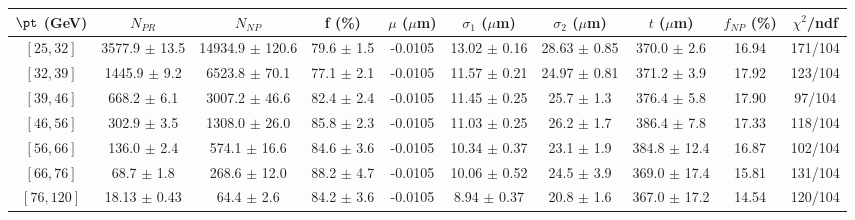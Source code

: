 \begin{tabular}{c||c|c|c|c|c|c|c||c|c}
$\pt$ (GeV) & $N_{PR}$ & $N_{NP}$ & f (\%) & $\mu$ ($\mu$m) & $\sigma_1$ ($\mu$m) & $\sigma_2$ ($\mu$m)  & $t$ ($\mu$m) & $f_{NP}$ (\%) & $\chi^2$/ndf \\
\hline
$[25, 32]$ & 3577.9 $\pm$ 13.5 & 14934.9 $\pm$ 120.6 & 79.6 $\pm$ 1.5 & -0.0105 & 13.02 $\pm$ 0.16 & 28.63 $\pm$ 0.85 & 370.0 $\pm$ 2.6 & 16.94 & 171/104\\
$[32, 39]$ & 1445.9 $\pm$ 9.2 & 6523.8 $\pm$ 70.1 & 77.1 $\pm$ 2.1 & -0.0105 & 11.57 $\pm$ 0.21 & 24.97 $\pm$ 0.81 & 371.2 $\pm$ 3.9 & 17.92 & 123/104\\
$[39, 46]$ & 668.2 $\pm$ 6.1 & 3007.2 $\pm$ 46.6 & 82.4 $\pm$ 2.4 & -0.0105 & 11.45 $\pm$ 0.25 & 25.7 $\pm$ 1.3 & 376.4 $\pm$ 5.8 & 17.90 & 97/104\\
$[46, 56]$ & 302.9 $\pm$ 3.5 & 1308.0 $\pm$ 26.0 & 85.8 $\pm$ 2.3 & -0.0105 & 11.03 $\pm$ 0.25 & 26.2 $\pm$ 1.7 & 386.4 $\pm$ 7.8 & 17.33 & 118/104\\
$[56, 66]$ & 136.0 $\pm$ 2.4 & 574.1 $\pm$ 16.6 & 84.6 $\pm$ 3.6 & -0.0105 & 10.34 $\pm$ 0.37 & 23.1 $\pm$ 1.9 & 384.8 $\pm$ 12.4 & 16.87 & 102/104\\
$[66, 76]$ & 68.7 $\pm$ 1.8 & 268.6 $\pm$ 12.0 & 88.2 $\pm$ 4.7 & -0.0105 & 10.06 $\pm$ 0.52 & 24.5 $\pm$ 3.9 & 369.0 $\pm$ 17.4 & 15.81 & 131/104\\
$[76, 120]$ & 18.13 $\pm$ 0.43 & 64.4 $\pm$ 2.6 & 84.2 $\pm$ 3.6 & -0.0105 & 8.94 $\pm$ 0.37 & 20.8 $\pm$ 1.6 & 367.0 $\pm$ 17.2 & 14.54 & 120/104\\
\end{tabular}
